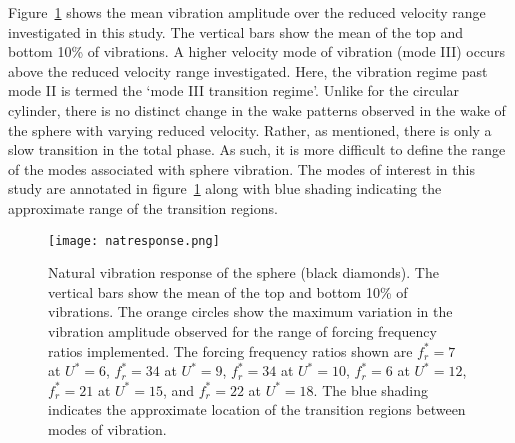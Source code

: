 \documentclass[3p]{elsarticle}
\newcommand{\Ustar}{\ensuremath{U^{*}}}
\newcommand{\freqrat}{\ensuremath{f_r^*}}
\begin{document}
Figure~\ref{fig:natres} shows the mean vibration amplitude
over the reduced velocity range investigated in this study. The
vertical bars show the mean of the top and bottom 10\% of vibrations.
A higher velocity mode of vibration (mode III) occurs above the
reduced velocity range investigated. Here, the vibration regime past
mode II is termed the `mode III transition regime'. Unlike for the circular cylinder, there is no distinct change in the wake patterns observed in the wake of the sphere with varying reduced velocity. Rather, as mentioned, there is only a slow transition in the total phase. As such, it is more difficult to define the range of the modes associated with sphere vibration. The modes of interest in this study are annotated in figure~\ref{fig:natres} along with blue shading indicating the approximate range of the transition regions.
%
\begin{figure}
	\centering
	\texttt{[image: natresponse.png]} %
	\caption{Natural vibration response of the sphere (black
		diamonds). The vertical bars show the mean of the top and
		bottom 10\% of vibrations. The orange circles show the
		maximum variation in the vibration amplitude observed for
		the range of forcing frequency ratios implemented. The
		forcing frequency ratios shown are $\freqrat=7$ at
		$\Ustar=6$, $\freqrat=34$ at $\Ustar=9$, $\freqrat=34$
		at $\Ustar=10$, $\freqrat=6$ at $\Ustar=12$,
		$\freqrat=21$ at $\Ustar=15$, and $\freqrat=22$ at
		$\Ustar=18$. The blue shading indicates the approximate location of the transition regions between modes of vibration.}
	\label{fig:natres}
\end{figure}
%
\end{document}
